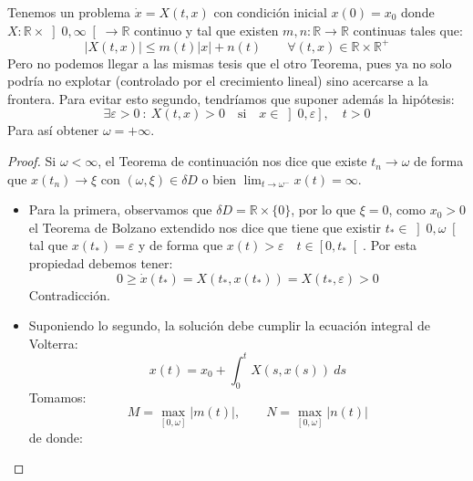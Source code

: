\begin{ejercicio}
    Tenemos un problema $\dot{x} = X(t,x)$ con condición inicial $x(0) = x_0$ donde $X:\mathbb{R}\times \left]0,\infty\right[\to \mathbb{R}$ continuo y tal que existen $m,n:\mathbb{R}\to \mathbb{R}$ continuas tales que:
    \begin{equation*}
        |X(t,x)| \leq m(t) |x| + n(t) \qquad \forall (t,x)\in \mathbb{R}\times\mathbb{R}^+
    \end{equation*}
    Pero no podemos llegar a las mismas tesis que el otro Teorema, pues ya no solo podría no explotar (controlado por el crecimiento lineal) sino acercarse a la frontera. Para evitar esto segundo, tendríamos que suponer además la hipótesis:
    \begin{equation*}
        \exists \varepsilon > 0 ~:~ X(t,x) >0 \quad \text{si}\quad x\in \left]0,\varepsilon\right], \quad t>0
    \end{equation*}
    Para así obtener $\omega = +\infty$.
    \begin{proof}
        Si $\omega < \infty$, el Teorema de continuación nos dice que existe $t_n\to \omega$ de forma que $x(t_n)\to \xi$ con $(\omega,\xi)\in \delta D$ o bien $\lim_{t\to\omega^-}x(t) = \infty$.
        \begin{itemize}
            \item Para la primera, observamos que $\delta D = \mathbb{R}\times \{0\}$, por lo que $\xi = 0$, como $x_0 > 0$ el Teorema de Bolzano extendido nos dice que tiene que existir $t_\ast \in \left]0,\omega\right[$ tal que $x(t_\ast) = \varepsilon$ y de forma que $x(t)>\varepsilon \quad t \in \left[0,t_\ast\right[$. Por esta propiedad debemos tener:
                \begin{equation*}
                    0 \geq \dot{x}(t_\ast) = X(t_\ast,x(t_\ast)) = X(t_\ast,\varepsilon) > 0
                \end{equation*}
                Contradicción.
            \item Suponiendo lo segundo, la solución debe cumplir la ecuación integral de Volterra:
                \begin{equation*}
                    x(t) = x_0 + \int_{0}^{t} X(s,x(s))~ds 
                \end{equation*}
                Tomamos:
                \begin{equation*}
                    M = \max_{[0,\omega]}|m(t)|, \qquad N = \max_{[0,\omega]}|n(t)|
                \end{equation*}
                de donde:

\end{itemize}
\end{proof}
\end{ejercicio}
